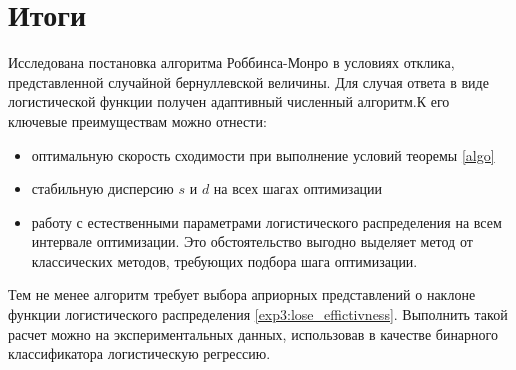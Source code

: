 \documentclass{mipt-thesis-bs}
\begin{document}
\section{Итоги}
Исследована постановка алгоритма Роббинса-Монро в условиях отклика, представленной случайной бернуллевской величины. 
Для случая ответа в виде логистической функции получен адаптивный численный алгоритм.К его ключевые преимуществам можно отнести:
\begin{itemize}
    \item оптимальную скорость сходимости при выполнение условий теоремы \ref{algo}
    \item стабильную дисперсию $s$ и $d$ на всех шагах оптимизации
    \item работу с естественными параметрами логистического распределения на всем интервале оптимизации. Это обстоятельство выгодно выделяет метод от классических методов, требующих подбора шага оптимизации.
\end{itemize}
Тем не менее алгоритм требует выбора априорных представлений о наклоне функции логистического распределения \ref{exp3:lose_effictivness}. Выполнить такой расчет можно на экспериментальных данных, использовав 
в качестве бинарного классификатора логистическую регрессию.
\end{document}
